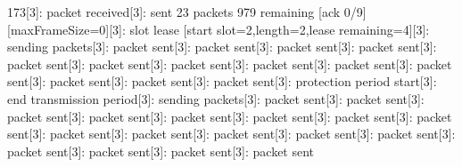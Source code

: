 \documentclass[parskip]{cs4rep}
\begin{document}
173[3]: packet received[3]: sent 23 packets 979 remaining [ack 0/9] [maxFrameSize=0][3]: slot lease [start slot=2,length=2,lease remaining=4][3]: sending packets[3]: packet sent[3]: packet sent[3]: packet sent[3]: packet sent[3]: packet sent[3]: packet sent[3]: packet sent[3]: packet sent[3]: packet sent[3]: packet sent[3]: packet sent[3]: packet sent[3]: packet sent[3]: protection period start[3]: end transmission period[3]: sending packets[3]: packet sent[3]: packet sent[3]: packet sent[3]: packet sent[3]: packet sent[3]: packet sent[3]: packet sent[3]: packet sent[3]: packet sent[3]: packet sent[3]: packet sent[3]: packet sent[3]: packet sent[3]: packet sent[3]: packet sent[3]: packet sent[3]: packet sent\newline
\end{document}
